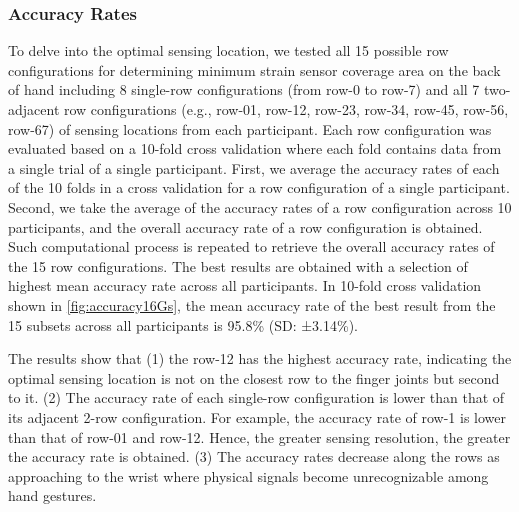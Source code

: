 \documentclass{sigchi}
\begin{document}
\subsubsection{Accuracy Rates}
To delve into the optimal sensing location, we tested all 15 possible row configurations for determining minimum strain sensor coverage area on the back of hand including 8 single-row configurations (from row-0 to row-7) and all 7 two-adjacent row configurations (e.g., row-01, row-12, row-23, row-34, row-45, row-56, row-67) of sensing locations from each participant.
Each row configuration was evaluated based on a 10-fold cross validation where each fold contains data from a single trial of a single participant.
First, we average the accuracy rates of each of the 10 folds in a cross validation for a row configuration of a single participant.
Second, we take the average of the accuracy rates of a row configuration across 10 participants, and the overall accuracy rate of a row configuration is obtained.
Such computational process is repeated to retrieve the overall accuracy rates of the 15 row configurations.
The best results are obtained with a selection of highest mean accuracy rate across all participants.
In 10-fold cross validation shown in \autoref{fig:accuracy16Gs}, the mean accuracy rate of the best result from the 15 subsets across all participants is 95.8\% (SD: ±3.14\%).

The results show that
(1) the row-12 has the highest accuracy rate, indicating the optimal sensing location is not on the closest row to the finger joints but second to it. 
(2) The accuracy rate of each single-row configuration is lower than that of its adjacent 2-row configuration. For example, the accuracy rate of row-1 is lower than that of row-01 and row-12. Hence, the greater sensing resolution, the greater the accuracy rate is obtained. 
(3) The accuracy rates decrease along the rows as approaching to the wrist where physical signals become unrecognizable among hand gestures.
\end{document}
